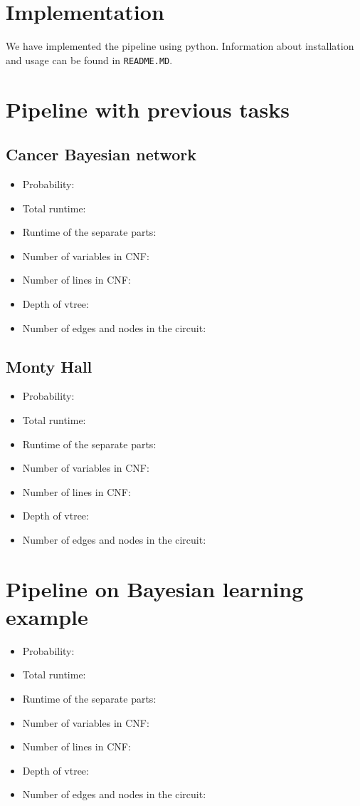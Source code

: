 \section{Implementation}
We have implemented the pipeline using python. Information about installation and usage can be found in \texttt{README.MD}.

\section{Pipeline with previous tasks}
\subsection{Cancer Bayesian network}
\begin{itemize}
    \item Probability:
    \item Total runtime:
    \item Runtime of the separate parts:
    \item Number of variables in CNF:
    \item Number of lines in CNF:
    \item Depth of vtree:
    \item Number of edges and nodes in the circuit:
\end{itemize}
\subsection{Monty Hall}
\begin{itemize}
    \item Probability:
    \item Total runtime:
    \item Runtime of the separate parts:
    \item Number of variables in CNF:
    \item Number of lines in CNF:
    \item Depth of vtree:
    \item Number of edges and nodes in the circuit:
\end{itemize}

\section{Pipeline on Bayesian learning example}
\begin{itemize}
    \item Probability:
    \item Total runtime:
    \item Runtime of the separate parts:
    \item Number of variables in CNF:
    \item Number of lines in CNF:
    \item Depth of vtree:
    \item Number of edges and nodes in the circuit:
\end{itemize}

